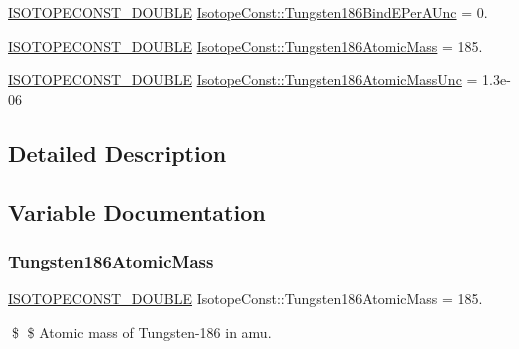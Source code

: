 \begin{DoxyCompactItemize}
\mbox{\hyperlink{group___isotope_const-_macros_ga8f45a7272ce02c0b4c65c44636ed719a}{I\+S\+O\+T\+O\+P\+E\+C\+O\+N\+S\+T\+\_\+\+D\+O\+U\+B\+LE}} \mbox{\hyperlink{group___isotope_const-_tungsten-_w186_ga68c0705c4532a1898b2a3177544ccf8e}{Isotope\+Const\+::\+Tungsten186\+Bind\+E\+Per\+A\+Unc}} = 0.
\item 
\mbox{\hyperlink{group___isotope_const-_macros_ga8f45a7272ce02c0b4c65c44636ed719a}{I\+S\+O\+T\+O\+P\+E\+C\+O\+N\+S\+T\+\_\+\+D\+O\+U\+B\+LE}} \mbox{\hyperlink{group___isotope_const-_tungsten-_w186_ga6f7f8db3c8133e2afd80fdcf5e6e014d}{Isotope\+Const\+::\+Tungsten186\+Atomic\+Mass}} = 185.
\item 
\mbox{\hyperlink{group___isotope_const-_macros_ga8f45a7272ce02c0b4c65c44636ed719a}{I\+S\+O\+T\+O\+P\+E\+C\+O\+N\+S\+T\+\_\+\+D\+O\+U\+B\+LE}} \mbox{\hyperlink{group___isotope_const-_tungsten-_w186_ga3fe5aa6d440e81480e8541567eb019e6}{Isotope\+Const\+::\+Tungsten186\+Atomic\+Mass\+Unc}} = 1.\+3e-\/06
\end{DoxyCompactItemize}


\subsection{Detailed Description}


\subsection{Variable Documentation}
\mbox{\label{group___isotope_const-_tungsten-_w186_ga6f7f8db3c8133e2afd80fdcf5e6e014d}} 
\subsubsection{\texorpdfstring{Tungsten186\+Atomic\+Mass}{Tungsten186AtomicMass}}
{\footnotesize\ttfamily \mbox{\hyperlink{group___isotope_const-_macros_ga8f45a7272ce02c0b4c65c44636ed719a}{I\+S\+O\+T\+O\+P\+E\+C\+O\+N\+S\+T\+\_\+\+D\+O\+U\+B\+LE}} Isotope\+Const\+::\+Tungsten186\+Atomic\+Mass = 185.}

\$ \$ Atomic mass of Tungsten-\/186 in amu. \mbox{\label{group___isotope_const-_tungsten-_w186_ga3fe5aa6d440e81480e8541567eb019e6}} 
